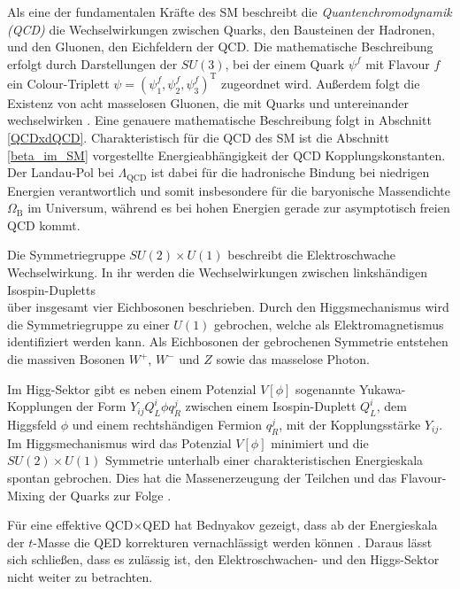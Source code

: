     Als eine der fundamentalen Kräfte des SM beschreibt die 
    \textit{Quantenchromodynamik (QCD)} die Wechselwirkungen 
    zwischen Quarks, den Bausteinen der Hadronen, und den Gluonen, den 
    Eichfeldern der QCD. Die mathematische Beschreibung erfolgt durch 
    Darstellungen der $SU(3)$, bei der einem Quark $\psi^f$ mit Flavour $f$ ein 
    Colour-Triplett $\psi = \left(\psi^f_1, \psi_2^f, \psi_3^f\right)^\text{T}$ 
    zugeordnet wird. 
    Außerdem folgt die Existenz von acht masselosen Gluonen, die mit Quarks und 
    untereinander wechselwirken \cite{Ellis_Webber}. Eine genauere 
    mathematische Beschreibung folgt in Abschnitt \ref{QCDxdQCD}. 
    Charakteristisch für die QCD des SM ist die Abschnitt \ref{beta_im_SM} 
    vorgestellte Energieabhängigkeit 
    der QCD Kopplungskonstanten. Der Landau-Pol bei $\Lambda_\text{QCD}$ ist 
    dabei für die hadronische Bindung bei niedrigen Energien verantwortlich 
    und somit insbesondere für die baryonische Massendichte $\Omega_\text{B}$ 
    im Universum, während es bei hohen Energien gerade zur asymptotisch 
    freien QCD kommt.
    
    Die Symmetriegruppe $SU(2)\times U(1)$ beschreibt die Elektroschwache 
    Wechselwirkung. In ihr werden die Wechselwirkungen zwischen  
    linkshändigen Isospin-Dupletts 
    \begin{equation}
      
    \end{equation}
    über insgesamt vier Eichbosonen beschrieben. Durch den Higgsmechanismus 
    wird die Symmetriegruppe zu einer $U(1)$ gebrochen, welche als 
    Elektromagnetismus identifiziert werden kann. Als Eichbosonen der 
    gebrochenen Symmetrie entstehen die massiven Bosonen $W^+$, $W^-$ und $Z$ 
    sowie das masselose Photon.
    
    Im Higg-Sektor gibt es neben einem Potenzial $V[\phi]$ sogenannte 
    Yukawa-Kopplungen der 
    Form $Y_{ij} Q_L^i \phi q_R^j $
    zwischen einem Isospin-Duplett $Q_L^i$, dem Higgsfeld $\phi$ und einem 
    rechtshändigen Fermion $q_R^j$, mit der Kopplungsstärke $Y_{ij}$. Im 
    Higgsmechanismus wird das 
    Potenzial $V[\phi]$ minimiert und die $SU(2)\times U(1)$ Symmetrie 
    unterhalb einer charakteristischen Energieskala spontan gebrochen. Dies hat 
    die Massenerzeugung der Teilchen und das Flavour-Mixing der Quarks zur 
    Folge \cite{PDG:Higgs}.
    
    Für eine effektive QCD$\times$QED 
    hat Bednyakov gezeigt, dass ab der Energieskala der $t$-Masse die QED 
    korrekturen vernachlässigt werden können \cite{Bednyakov2015262}. Daraus 
    lässt sich schließen, dass es zulässig ist, den Elektroschwachen- und 
    den Higgs-Sektor nicht weiter zu betrachten. 
    

